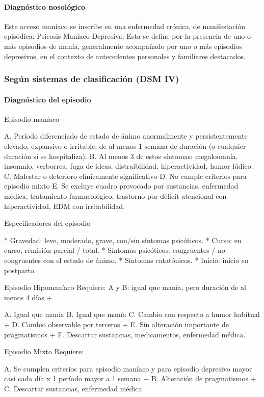 \paragraph{Diagnóstico nosológico}
Este acceso maníaco se inscribe en una enfermedad crónica, de manifestación episódica: Psicosis Maníaco-Depresiva. Esta se define por la presencia de uno o más episodios de manía, generalmente acompañado por uno o más episodios depresivos, en el contexto de antecedentes personales y familiares destacados.
\subsubsection*{Según sistemas de clasificación (DSM IV)}
\paragraph{Diagnóstico del episodio}
Episodio maníaco

A. Período diferenciado de estado de ánimo anormalmente y persistentemente elevado, expansivo o irritable, de al menos 1 semana de duración (o cualquier duración si se hospitaliza).
B. Al menos 3 de estos síntomas: megalomanía, insomnio, verborrea, fuga de ideas, distraibilidad, hiperactividad, humor lúdico.
C. Malestar o deterioro clínicamente significativo
D. No cumple criterios para episodio mixto
E. Se excluye cuadro provocado por sustancias, enfermedad médica, tratamiento farmacológico, trastorno por déficit atencional con hiperactividad, EDM con irritabilidad.

Especificadores del episodio

* Gravedad: leve, moderado, grave, con/sin síntomas psicóticos.
* Curso: en curso, remisión parcial / total.
* Síntomas psicóticos: congruentes / no congruentes con el estado de ánimo.
* Síntomas catatónicos.
* Inicio: inicio en postparto.

Episodio Hipomaníaco Requiere: A y B: igual que manía, pero duración de al menos 4 días +

A. Igual que manía
B. Igual que manía
C. Cambio con respecto a humor habitual +
D. Cambio observable por terceros +
E. Sin alteración importante de pragmatismos +
F. Descartar sustancias, medicamentos, enfermedad médica.

Episodio Mixto Requiere:

A. Se cumplen criterios para episodio maníaco y para episodio depresivo mayor casi cada día x 1 período mayor a 1 semana +
B. Alteración de pragmatismos +
C. Descartar sustancias, enfermedad médica.

